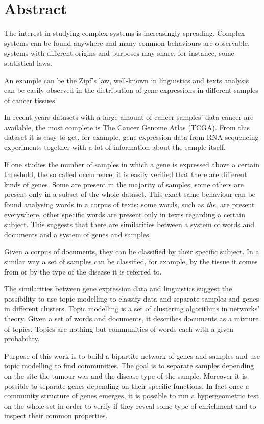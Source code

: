 \chapter*{Abstract}
The interest in studying complex systems is increasingly spreading.
Complex systems can be found anywhere and many common behaviours are observable, systems with different origins and purposes 
may share, for instance, some statistical laws.

An example can be the Zipf's law, well-known in linguistics and texts analysis 
can be easily observed in the distribution of gene expressions in different samples of cancer tissues.

In recent years datasets with a large amount of cancer samples' data cancer are available, the most complete is The Cancer Genome Atlas (TCGA).
From this dataset it is easy to get, for example, gene expression data from RNA sequencing experiments 
together with a lot of information about the sample itself.

If one studies the number of samples in which a gene is expressed above a certain threshold, 
the so called occurrence, it is easily verified that there are different kinds of 
genes. Some are present in the majority of samples, some others are present only 
in a subset of the whole dataset. This exact same behaviour can be found analysing words in a corpus of texts; some words, such as \textit{the},
are present everywhere, other specific words are present only in texts regarding a certain subject.
This suggests that there are similarities between a system of words and documents and a system of genes and samples.

Given a corpus of documents, they can be classified by their specific subject. In a similar way a set of samples can be 
classified, for example, by the tissue it comes from or by the type of the disease it is 
referred to.

The similarities between gene expression data and linguistics suggest the possibility to use topic modelling to classify 
data and separate samples and genes in different clusters. Topic modelling is a set of clustering algorithms in networks' theory. 
Given a set of words and documents, it describes documents as a mixture of topics. 
Topics are nothing but communities of words each with a given probability. 

Purpose of this work is to build a bipartite network of genes and samples and use topic modelling to find 
communities. The goal is to separate samples depending on the site the tumour was 
and the disease type of the sample. Moreover it is possible to separate genes depending on their specific functions. 
In fact once a community structure of genes emerges, 
it is possible to run a hypergeometric test on the whole set in order to verify 
if they reveal some type of enrichment and to inspect their common properties.

